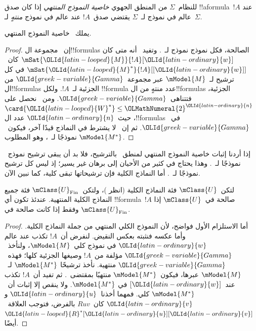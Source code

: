 \documentclass[../../../include/open-logic-section]{subfiles}
\begin{document}


\begin{defn}
  للنظام~$\Sigma$ من المنطق الجهوي \emph{خاصية النموذج المنتهي} إذا
  كان صدق !!a{formula}~$!A$ عند عالم في نموذج لـ~$\Sigma$ يقتضي
  صدق~$!A$ عند عالم في نموذج \emph{منتهٍ} لـ~$\Sigma$.
\end{defn}

\begin{prop}
  يملك~ خاصية النموذج المنتهي.
\end{prop}

\begin{proof}
  إن~ مجموعة ال!!{formula}s الصالحة، فكل نموذج نموذج
  لـ~. وتفيد~ أنه متى كان
  $\mSat{\OLId{latin-looped}{M}}{!A}[\OLId{latin-ordinary}{w}]$ كان~$\mSat{\OLId{latin-looped}{M}^*}{!A}[{[\OLId{latin-ordinary}{w}]}]$ في كل ترشيح
  لـ~$\mModel{M}$ عبر مجموعة~$\OLId{greek-variable}{Gamma}$ من ال!!{formula}s الجزئية
  لـ~$!A$. ولكل !!{formula} عدد منتهٍ من ال!!{formula}s الجزئية،
  فتتناهى~$\OLId{greek-variable}{Gamma}$. ومن~ نحصل على
  $\card{\OLId{latin-looped}{W}^*} \le \OLMathNumeral{2}^\OLId{latin-ordinary}{n}$، حيث~$\OLId{latin-ordinary}{n}$ عدد ال!!{formula}s في~$\OLId{greek-variable}{Gamma}$.
  ثم إن~ لا يشترط في النماذج قيدًا آخر، فيكون~$\mModel{M^*}$
  نموذجًا لـ~، وهو المطلوب.
\end{proof}

إذا أردنا إثبات خاصية النموذج المنتهي لمنطق~ بالترشيح، فلا بد
أن يبقى ترشيح نموذج~ نموذجًا لـ~. وهذا يحتاج في كثير من
الأحيان إلى برهان غير يسير؛ إذ ليس كل ترشيح نموذجًا لـ~.
أما النماذج الكلية فإن ترشيحاتها تبقى كلية، كما نبين الآن.

\begin{prop}
  لتكن~$\mClass{U}$ فئة النماذج الكلية (انظر
  )، ولتكن~$\mClass{U}_\mathrm{Fin}$
  فئة جميع النماذج الكلية المنتهية. عندئذ تكون أي !!{formula}~$!A$
  صالحة في~$\mClass{U}$ إذا وفقط إذا كانت صالحة في
  $\mClass{U}_\mathrm{Fin}$.
\end{prop}

\begin{proof}
  أما الاستلزام الأول فواضح، لأن النموذج الكلي المنتهي من جملة النماذج
  الكلية. وأما عكسه فنثبته بعكس النقيض. لنفرض أن~$!A$ تكذب عند عالم
  $\OLId{latin-ordinary}{w}$ في نموذج كلي~$\mModel{M}$، ولنأخذ~$\OLId{greek-variable}{Gamma}$ مؤلفة من~$!A$
  وصيغها الجزئية كلها؛ فهذه~$\OLId{greek-variable}{Gamma}$ منتهية. نأخذ ترشيحًا
  $\mModel{M^*}$ لـ~$\mModel{M}$ عبرها، فيكون~$\mModel{M^*}$ منتهيًا
  بمقتضى~. ثم تفيد
   أن~$!A$ تكذب عند~$[\OLId{latin-ordinary}{w}]$ في
  $\mModel{M^*}$. ولا ينقص إلا إثبات أن~$\mModel{M^*}$ كلي.
  فمهما أخذنا~$\OLId{latin-ordinary}{u}$ و$\OLId{latin-ordinary}{v}$ كان~$Ruv$ بالفرض، فتوجب
  العلاقة~$\OLId{latin-looped}{R}^*[\OLId{latin-ordinary}{u}][\OLId{latin-ordinary}{v}]$ أيضًا.
\end{proof}
\end{document}
